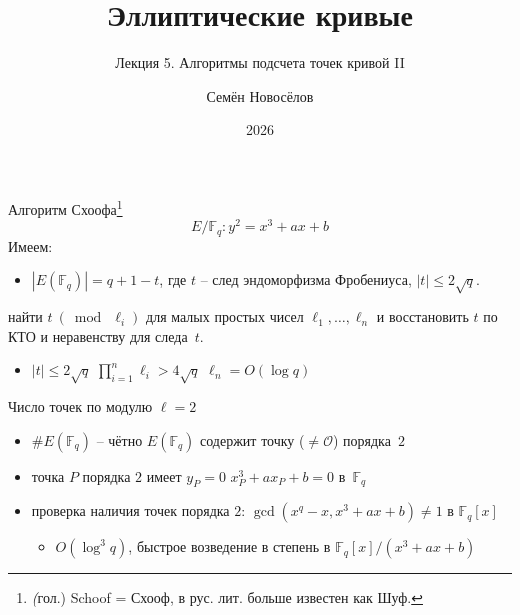 \documentclass{beamer}
\title{Эллиптические кривые}
\subtitle{Лекция 5. Алгоритмы подсчета точек кривой II}
\author{Семён Новосёлов}
\institute{БФУ им. И. Канта}
\date{2026}
\begin{document}
\frame{\titlepage}

%    

\begin{frame}{Алгоритм Схоофа\footnote{\textit(гол.) Schoof = Схооф, в рус. лит. больше известен как Шуф.}}
\[
E/\mathbb{F}_q: y^2 = x^3 + a x + b
\]
Имеем:
\begin{itemize}
    \item $|E(\mathbb{F}_q)| = q + 1 - t$, где $t$ -- след эндоморфизма Фробениуса, $|t| \leq 2 \sqrt{q}$.
\end{itemize}

\vspace{1em}
 найти $t~(\bmod~\ell_i)$ для малых простых чисел $\ell_1, \ldots, \ell_n$ и восстановить $t$ по КТО и неравенству для следа~$t$.

\begin{itemize}
    \item $|t| \leq 2 \sqrt{q}$ \structure{$\implies$} $\prod_{i=1}^{n} \ell_i > 4 \sqrt{q}$ \structure{$\implies$} $\ell_n = O(\log{q})$
\end{itemize}
\end{frame}

\begin{frame}{Число точек по модулю $\ell = 2$}
    \begin{itemize}
        \item $\#E(\mathbb{F}_q)$ -- чётно \structure{$\iff$} $E(\mathbb{F}_q)$ содержит точку ($\neq \mathcal{O}$) порядка~$2$
        \vspace{0.5em}
        \item точка $P$ порядка $2$ имеет $y_P=0$ \structure{$\iff$} $x_P^3 + a x_P + b = 0$ в~$\mathbb{F}_q$
        \vspace{0.5em}
        \item проверка наличия точек порядка $2$: $\gcd(x^q - x, x^3 + a x + b) \neq 1$ в $\mathbb{F}_q[x]$
        \begin{itemize}
            \item[$\implies$] $O(\log^3{q})$, быстрое возведение в степень в $\mathbb{F}_q[x]/(x^3 + a x + b)$
         \end{itemize}
    \end{itemize}
\end{frame}
\end{document}
